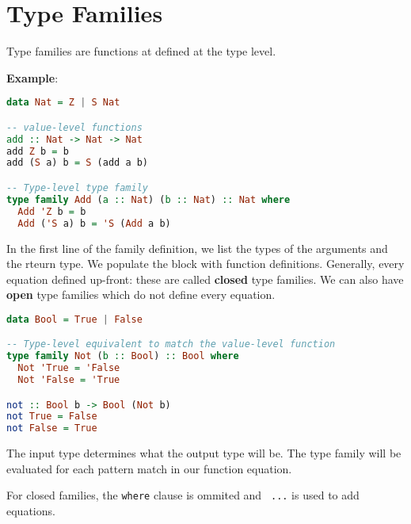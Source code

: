 \section{Type Families}

Type families are functions at defined at the type level.

\textbf{Example}:
\begin{lstlisting}[language=haskell]
data Nat = Z | S Nat

-- value-level functions
add :: Nat -> Nat -> Nat
add Z b = b
add (S a) b = S (add a b)

-- Type-level type family
type family Add (a :: Nat) (b :: Nat) :: Nat where
  Add 'Z b = b
  Add ('S a) b = 'S (Add a b)
\end{lstlisting}

In the first line of the family definition, we list the types of the arguments and the rteurn type. We populate the block with function definitions.
Generally, every equation defined up-front: these are called \textbf{closed} type families. We can also have \textbf{open} type families which do not define every equation.

\begin{lstlisting}[language=haskell]
data Bool = True | False

-- Type-level equivalent to match the value-level function
type family Not (b :: Bool) :: Bool where
  Not 'True = 'False
  Not 'False = 'True

not :: Bool b -> Bool (Not b)
not True = False
not False = True
\end{lstlisting}

The input type determines what the output type will be. The type family will be evaluated for each pattern match in our function equation.

For closed families, the \texttt{where} clause is ommited and \texttt{ ...} is used to add equations.